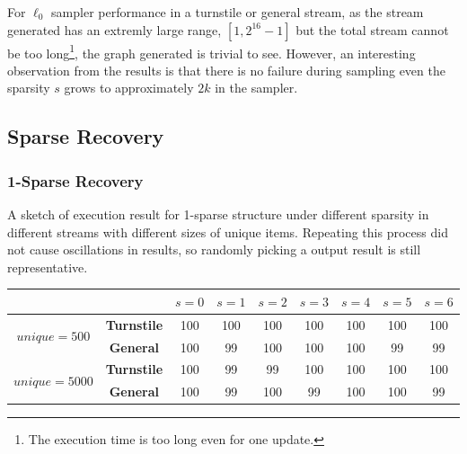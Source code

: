 \documentclass[a4paper, 11pt]{article}
\begin{document}
            For $\ell_{0}$ sampler performance in a turnstile or general stream, as the stream generated has an extremly large range, $\left[ 1,2^{16}-1 \right]$ but the total stream cannot be too long\footnote{The execution time is too long even for one update.}, the graph generated is trivial to see. However, an interesting observation from the results is that there is no failure during sampling even the sparsity $s$ grows to approximately $2k$ in the sampler.
        \subsection{Sparse Recovery}
            \subsubsection{1-Sparse Recovery}
                A sketch of execution result for 1-sparse structure under different sparsity in different streams with different sizes of unique items. Repeating this process did not cause oscillations in results, so randomly picking a output result is still representative.
                \begin{table}[h]
                    \centering
                    \begin{tabular}{|c|c|c|c|c|c|c|c|c|}
                    \hline
                                                     &                    & $s = 0$ & $s = 1$ & $s = 2$ & $s = 3$ & $s = 4$ & $s = 5$ & $s = 6$ \\ \hline
                    \multirow{2}{*}{$unique = 500$}  & \textbf{Turnstile} & 100     & 100     & 100     & 100     & 100     & 100     & 100     \\ \cline{2-9}
                                                     & \textbf{General}   & 100     & 99      & 100     & 100     & 100     & 99      & 99      \\ \hline
                    \multirow{2}{*}{$unique = 5000$} & \textbf{Turnstile} & 100     & 99      & 99      & 100     & 100     & 100     & 100     \\ \cline{2-9}
                                                     & \textbf{General}   & 100     & 99      & 100     & 99      & 100     & 100     & 99      \\ \hline
                    \end{tabular}
                \end{table}
\end{document}
